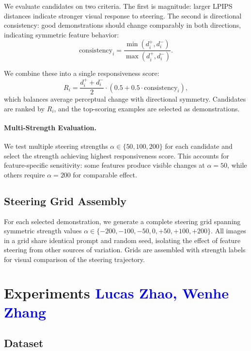 \documentclass{article}
\begin{document}
We evaluate candidates on two criteria. The first is magnitude: larger LPIPS distances indicate stronger visual response to steering. The second is directional consistency: good demonstrations should change comparably in both directions, indicating symmetric feature behavior:
\begin{equation}
\mathrm{consistency}_i = \frac{\min(d^+_i, d^-_i)}{\max(d^+_i, d^-_i)}.
\end{equation}

We combine these into a single responsiveness score:
\begin{equation}
R_i = \frac{d^+_i + d^-_i}{2} \cdot \left( 0.5 + 0.5 \cdot \mathrm{consistency}_i \right),
\end{equation}
which balances average perceptual change with directional symmetry. Candidates are ranked by $R_i$, and the top-scoring examples are selected as demonstrations.

\paragraph{Multi-Strength Evaluation.}
We test multiple steering strengths $\alpha \in \{50, 100, 200\}$ for each candidate and select the strength achieving highest responsiveness score. This accounts for feature-specific sensitivity: some features produce visible changes at $\alpha = 50$, while others require $\alpha = 200$ for comparable effect.

\subsection{Steering Grid Assembly}

For each selected demonstration, we generate a complete steering grid spanning symmetric strength values $\alpha \in \{-200, -100, -50, 0, +50, +100, +200\}$. All images in a grid share identical prompt and random seed, isolating the effect of feature steering from other sources of variation. Grids are assembled with strength labels for visual comparison of the steering trajectory.




\section{Experiments \textcolor{blue}{Lucas Zhao, Wenhe Zhang}}
\label{sec:experiments}

\subsection{Dataset}
\end{document}

